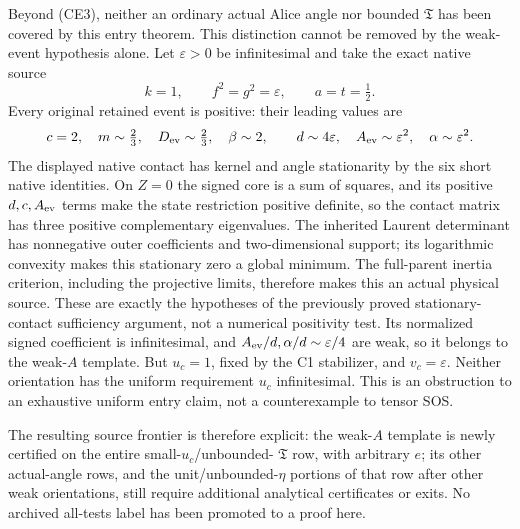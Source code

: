 Beyond (CE3), neither an ordinary actual Alice angle nor bounded
$\mathfrak T$ has been covered by this entry theorem. This distinction
cannot be removed by the weak-event hypothesis alone. Let $\varepsilon>0$
be infinitesimal and take the exact native source
\[
 k=1,\qquad f^2=g^2=\varepsilon,\qquad a=t=\tfrac12.
                                                               \tag{CE14}
\]
Every original retained event is positive: their leading values are
\[
 c=2,\quad m\sim\tfrac23,\quad D_{\rm ev}\sim\tfrac23,
 \quad\beta\sim2,\qquad
 d\sim4\varepsilon,\quad A_{\rm ev}\sim\varepsilon^2,
 \quad\alpha\sim\varepsilon^2.
\]
The displayed native contact has kernel and angle stationarity by the
six short native identities. On $Z=0$ the signed core is a sum of
squares, and its positive $d,c,A_{\rm ev}$ terms make the state
restriction positive definite, so the contact matrix has three positive
complementary eigenvalues. The inherited Laurent determinant has
nonnegative outer coefficients and two-dimensional support; its
logarithmic convexity makes this stationary zero a global minimum.
The full-parent inertia criterion, including the projective limits,
therefore makes this an actual physical source. These are exactly the
hypotheses of the previously proved stationary-contact sufficiency
argument, not a numerical positivity test. Its normalized signed coefficient is infinitesimal,
and $A_{\rm ev}/d,\alpha/d\sim\varepsilon/4$ are weak, so it belongs
to the weak-$A$ template. But $u_c=1$, fixed by the C1 stabilizer, and
$v_c=\varepsilon$. Neither orientation has the uniform requirement
$u_c$ infinitesimal. This is an obstruction to an exhaustive uniform
entry claim, not a counterexample to tensor SOS.

The resulting source frontier is therefore explicit: the weak-$A$
template is newly certified on the entire small-$u_c$/unbounded-
$\mathfrak T$ row, with arbitrary $e$; its other actual-angle rows,
and the unit/unbounded-$\eta$ portions of that row after other weak
orientations, still require additional analytical certificates or exits.
No archived all-tests label has been promoted to a proof here.
